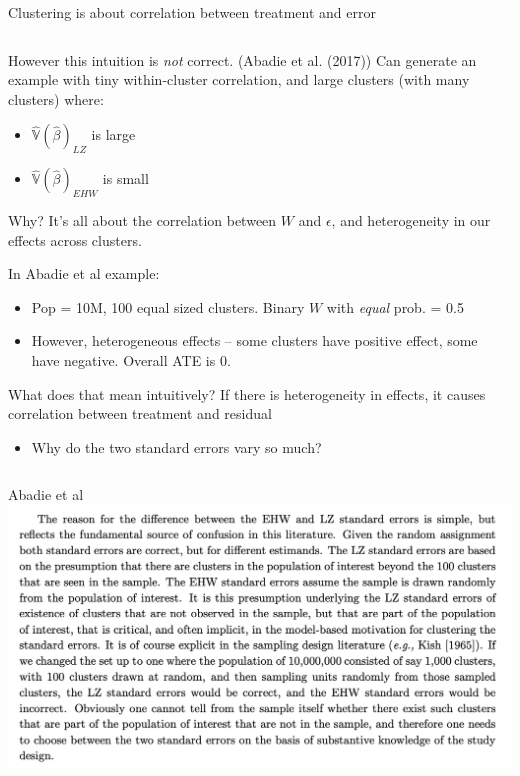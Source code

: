 \documentclass[notes,11pt, aspectratio=169]{beamer}
\newenvironment{wideitemize}{\itemize\addtolength{\itemsep}{10pt}}{\enditemize}
\begin{document}
\begin{frame}{Clustering is about correlation between treatment and error}
\begin{columns}[T] %
\begin{column}{.8\textwidth}
  \begin{wideitemize}
  \item However this intuition is \emph{not} correct.  (Abadie et
    al. (2017)) Can generate an example with tiny within-cluster
    correlation, and large clusters (with many clusters) where:
    \begin{itemize}
    \item $\hat{\mathbb{V}}(\hat{\beta})_{LZ}$ is large
    \item $\hat{\mathbb{V}}(\hat{\beta})_{EHW}$ is small
    \end{itemize}
  \item Why? It's all about the correlation between $W$ and
    $\epsilon$, and heterogeneity in our effects across clusters.
  \item In Abadie et al example:
    \begin{itemize}
    \item Pop = 10M, 100 equal sized clusters. Binary $W$ with
      \emph{equal} prob. = 0.5
    \item However, heterogeneous effects -- some clusters have
      positive effect, some have negative. Overall ATE is 0.
    \end{itemize}
  \item What does that mean intuitively? If there is heterogeneity in
    effects, it causes correlation between treatment and residual
    \begin{itemize}
  \item Why do the two standard errors vary so much? 
    \end{itemize}
  \end{wideitemize}
  \end{column}%
  \hfill%
  \begin{column}{.5\textwidth}
  \end{column}
\end{columns}
\end{frame}

\begin{frame}{Abadie et al}
  \includegraphics[width=\linewidth]{images/abadiecluster.png}
\end{frame}
\end{document}
